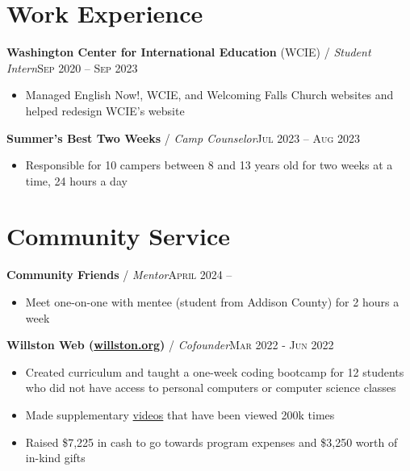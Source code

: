 \documentclass[12pt, a4paper]{article}
\begin{document}
\vspace{-8mm}
\section*{Work Experience}
\vspace{-2mm}

\textbf{Washington Center for International Education} (WCIE) / \textit{Student Intern}\hfill\textsc{Sep 2020 -- Sep 2023}\\
\begin{itemize}
    \vspace{-8mm}
    \item Managed English Now!, WCIE, and Welcoming Falls Church websites and helped redesign WCIE's website
\end{itemize}

\textbf{Summer's Best Two Weeks} / \textit{Camp Counselor}\hfill\textsc{Jul 2023 -- Aug 2023}\\
\begin{itemize}
    \vspace{-8mm}
    \item Responsible for 10 campers between 8 and 13 years old for two weeks at a time, 24 hours a day
\end{itemize}

\vspace{-8mm}
\section*{Community Service}
\vspace{-2mm}

\textbf{Community Friends} / \textit{Mentor}\hfill\textsc{April 2024 --}\\
\begin{itemize}
    \vspace{-8mm}
    \item Meet one-on-one with mentee (student from Addison County) for 2 hours a week
\end{itemize}

\textbf{Willston Web (\href{https://willston.org}{willston.org})} / \textit{Cofounder}\hfill\textsc{Mar 2022 - Jun 2022}\\
\begin{itemize}
    \vspace{-8mm}
    \item Created curriculum and taught a one-week coding bootcamp for 12 students who did not have access to personal computers or computer science classes
    \item Made supplementary \href{https://youtube.com/JonathanBuchh}{videos} that have been viewed 200k times
    \item Raised \$7,225 in cash to go towards program expenses and \$3,250 worth of in-kind gifts
\end{itemize}
\end{document}
